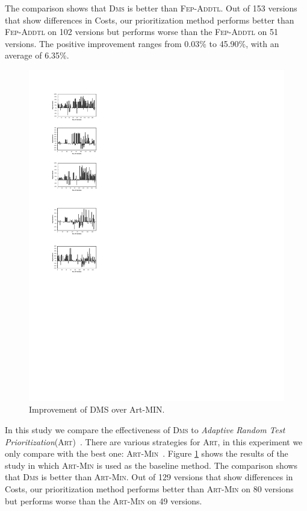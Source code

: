 The comparison shows that \textsc{Dms} is better than \textsc{Fep-Addtl}.
Out of 153 versions that show differences in Costs, our prioritization method performs
better than \textsc{Fep-Addtl} on 102 versions but performs worse than the
\textsc{Fep-Addtl} on 51 versions.
The positive improvement ranges from 0.03\% to 45.90\%, with an average of 6.35\%.


\begin{figure}[!htbp]
    \centering
    \includegraphics[width=12cm]{our_vs_artmin.pdf}
    \caption{Improvement of D{\scriptsize MS} over A{\scriptsize rt}-M{\scriptsize IN}.}
    \label{fig:our_vs_artmin}
\end{figure}

\vspace{0.2cm}
 In this study we compare the effectiveness of \textsc{Dms} to {\em Adaptive Random Test Prioritization}(\textsc{Art})~\citep{JiangZCT09}.
There are various strategies for \textsc{Art}, in this experiment we only compare with the best one: \textsc{Art-Min}~\citep{JiangZCT09, Gonzalez-SanchezPAGG11, Alberto2011}.
Figure \ref{fig:our_vs_artmin} shows the results of the study in which \textsc{Art-Min} is used
as the baseline method. The comparison shows that \textsc{Dms} is better than \textsc{Art-Min}.
Out of 129 versions that show differences in Costs, our prioritization method performs
better than \textsc{Art-Min} on 80 versions but performs worse than the
\textsc{Art-Min} on 49 versions.

